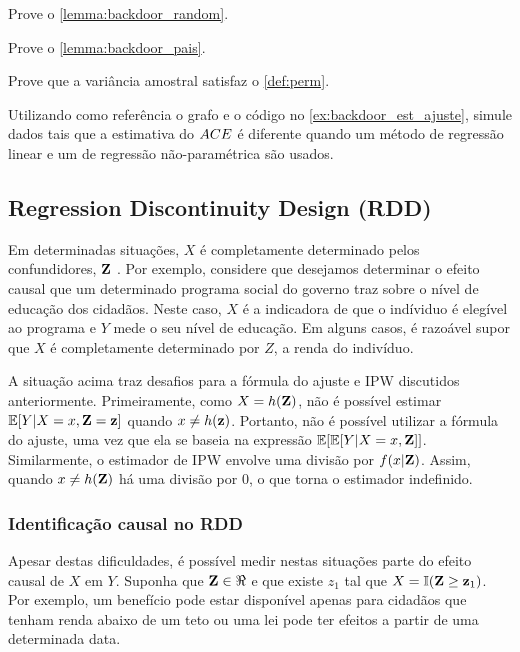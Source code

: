 \begin{exercise}
 Prove o \cref{lemma:backdoor_random}.
\end{exercise}

\begin{exercise}
 Prove o \cref{lemma:backdoor_pais}.
\end{exercise}

\begin{exercise}
 Prove que a variância amostral satisfaz
 o \cref{def:perm}.
\end{exercise}

\begin{exercise}
 Utilizando como referência o grafo e
 o código no \cref{ex:backdoor_est_ajuste},
 simule dados tais que a estimativa do ${ACE}$ é
 diferente quando um método de regressão linear e
 um de regressão não-paramétrica são usados.
\end{exercise}

\subsection{Regression Discontinuity Design (RDD)}

Em determinadas situações,
$X$ é completamente determinado
pelos confundidores, ${\mathbf{Z}}$ \citep{Lee2010}.
Por exemplo, considere que 
desejamos determinar o efeito causal que
um determinado programa social do governo traz 
sobre o nível de educação dos cidadãos.
Neste caso, $X$ é a indicadora de que
o indíviduo é elegível ao programa e
$Y$ mede o seu nível de educação.
Em alguns casos, é razoável supor que
$X$ é completamente determinado por $Z$,
a renda do indivíduo.

A situação acima traz desafios para
a fórmula do ajuste e IPW discutidos anteriormente.
Primeiramente, como $X = h({\mathbf{Z}})$, 
não é possível estimar ${\mathbb E}[Y|X=x,{\mathbf{Z}}={\mathbf{z}}]$
quando $x \neq h({\mathbf{z}})$.
Portanto, não é possível utilizar
a fórmula do ajuste, uma vez que
ela se baseia na expressão ${\mathbb E}[{\mathbb E}[Y|X=x,{\mathbf{Z}}]]$.
Similarmente, o estimador de IPW envolve
uma divisão por $f(x|{\mathbf{Z}})$.
Assim, quando $x \neq h({\mathbf{Z}})$
há uma divisão por $0$, 
o que torna o estimador indefinido.

\subsubsection{Identificação causal no RDD}

Apesar destas dificuldades,
é possível medir nestas situações
parte do efeito causal de $X$ em $Y$.
Suponha que ${\mathbf{Z}} \in \Re$ e que 
existe $z_1$ tal que $X = {\mathbb I}({\mathbf{Z}} \geq {\mathbf{z}}_1)$. 
Por exemplo, um benefício pode estar disponível
apenas para cidadãos que tenham renda 
abaixo de um teto ou
uma lei pode ter efeitos
a partir de uma determinada data.

